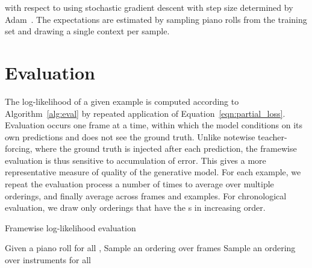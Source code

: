 \documentclass{article}
\begin{document}
with respect to  using stochastic gradient descent with step size determined by Adam~\cite{kingma2014adam}.
The expectations are estimated by sampling piano rolls  from the training set and drawing a single context  per sample.



\section{Evaluation} \label{sec:evaluation}

The log-likelihood of a given example is computed according to Algorithm~\ref{alg:eval} by repeated application of Equation~\ref{eqn:partial_loss}.
Evaluation occurs one frame at a time, within which the model conditions on its own predictions and does not see the ground truth.
Unlike notewise teacher-forcing, where the ground truth is injected after each prediction, the framewise 
evaluation is thus sensitive to accumulation of error.
This gives a more representative measure of quality of the generative model.
For each example, we repeat the evaluation process a number of times to average over multiple orderings, and finally average across frames and examples.
For chronological evaluation, we draw only orderings that have the s in increasing order.

\begin{algorithm}
\caption{Framewise log-likelihood evaluation}
\label{alg:eval}
\begin{algorithmic}
\State Given a piano roll 
\State  for all 
  \State , 
  \State Sample an ordering  over frames
  \For{}
    \State Sample an ordering  over instruments
    \For{}
      \State  for all 
      \State 
      \State 
      \State 
    \EndFor
    \State 
  \EndFor
\EndFor
\\ \Return  \\
\end{algorithmic}
\end{algorithm}
\end{document}
